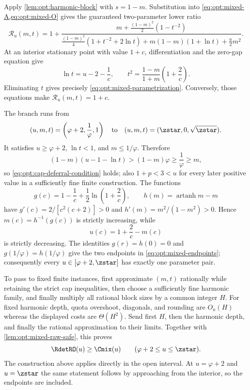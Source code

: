 Apply \cref{lem:opt:harmonic-block} with $s=1-m$.  Substitution into
\cref{eq:opt:mixed-A,eq:opt:mixed-O} gives the guaranteed two-parameter
lower ratio
\begin{equation}
 \mathcal R_u(m,t)=1+
 \frac{m+\frac{(1-m)^2}{2}(1-t^{-2})}
 {\frac{(1-m)^2}{4}(1+t^{-2}+2\ln t)
  +m(1-m)(1+\ln t)+\frac u2m^2}.
 \label{eq:opt:mixed-ratio}
\end{equation}
At an interior stationary point with value $1+c$, differentiation and the
zero-gap equation give
\begin{equation}
 \ln t=u-2-\frac1c,
 \qquad
 t^2=\frac{1-m}{1+m}\left(1+\frac2c\right).
 \label{eq:opt:mixed-stationarity}
\end{equation}
Eliminating $t$ gives precisely
\cref{eq:opt:mixed-parametrization}.  Conversely, those equations make
$\mathcal R_u(m,t)=1+c$.

The branch runs from
\begin{equation}
 (u,m,t)=\left(\varphi+2,\frac1\varphi,1\right)
 \quad\text{to}\quad
 (u,m,t)=(\zstar,0,\sqrt{\zstar}).
 \label{eq:opt:mixed-endpoints}
\end{equation}
It satisfies $u\ge\varphi+2$, $\ln t<1$, and $m\le1/\varphi$.  Therefore
\begin{equation}
 (1-m)(u-1-\ln t)
 >(1-m)\varphi\ge\frac1\varphi\ge m,
\end{equation}
so \cref{eq:opt:cap-deferral-condition} holds; also $1+p<3<u$ for every
later positive value in a sufficiently fine finite construction.  The
functions
\begin{equation}
 g(c)=1-\frac1c+\frac12\ln\!\left(1+\frac2c\right),
 \qquad h(m)=\operatorname{artanh}m-m
\end{equation}
have $g'(c)=2/[c^2(c+2)]>0$ and
$h'(m)=m^2/(1-m^2)>0$.  Hence $m(c)=h^{-1}(g(c))$ is strictly increasing,
while
\begin{equation}
 u(c)=1+\frac2c-m(c)
\end{equation}
is strictly decreasing.  The identities $g(r)=h(0)=0$ and
$g(1/\varphi)=h(1/\varphi)$ give the two endpoints in
\cref{eq:opt:mixed-endpoints}; consequently every
$u\in[\varphi+2,\zstar]$ has exactly one parameter pair.

To pass to fixed finite instances, first approximate $(m,t)$ rationally
while retaining the strict cap inequalities, then choose a sufficiently
fine harmonic family, and finally multiply all rational block sizes by a
common integer $H$.  For fixed harmonic depth, quota overshoot, diagonals,
and rounding are $O_u(H)$ whereas the displayed costs are $\Theta(H^2)$.
Send first $H$, then the harmonic depth, and finally the rational
approximation to their limits.  Together with
\cref{lem:opt:mixed-raw-safe}, this proves
\begin{equation}
 \RdetRO(u)\ge \Cmix(u)
 \qquad(\varphi+2\le u\le \zstar).
 \label{eq:opt:mixed-lower-final}
\end{equation}
The construction above applies directly in the open interval.  At
$u=\varphi+2$ and $u=\zstar$ the same statement follows by approaching from
the interior, so the endpoints are included.

